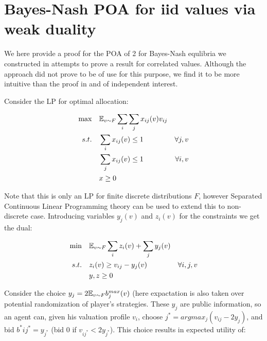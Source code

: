 \section{Bayes-Nash POA for iid values via weak duality} 
We here provide a proof for the POA of 2 for Bayes-Nash equlibria we constructed in attempts to prove a result for correlated values. Although the approach did not prove to be of use for this purpose, we find it to be more intuitive than the proof in \cite{survey} and of independent interest.

Consider the LP for optimal allocation:

\begin{align*}
\max \quad &{\mathbb{E}}_{v\sim F} \sum_i\sum_j x_{ij}(v)v_{ij}\\
s.t.\quad & \sum_i x_{ij}(v)\leq 1 \quad &\forall j,v\\
& \sum_j x_{ij}(v)\leq 1 \quad &\forall i,v\\
&x\geq0
\end{align*}

Note that this is only an LP for finite discrete distributions $F$, however Separated Continuous Linear Programming theory can be used to extend this to non-discrete case. Introducing variables $y_j(v)$ and $z_i(v)$ for the constraints we get the dual:

\begin{align*}
\min \quad &{\mathbb{E}}_{v\sim F} \sum_i z_i(v) + \sum_j y_j(v)\\
s.t.\quad & z_i(v)\geq v_{ij}-y_j(v) &\forall i,j,v\\
&y,z\geq0
\end{align*}

%

Consider the choice $y_j = 2{\mathbb{E}}_{v\sim F} b_j^{max} (v)$ (here expactation is also taken over potential randomization of player's strategies. These $y_j$ are public information, so an agent can, given his valuation profile $v_i$, choose $j^* = argmax_j (v_{ij}-2y_j)$, and bid $b^*{ij^*} = y_{j^*}$ (bid 0 if $v_{ij^*}<2y_{j^*}$). This choice results in expected utility of:

